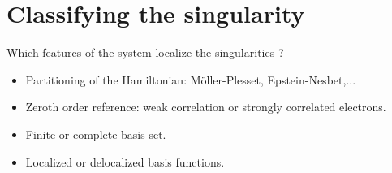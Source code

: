 \documentclass[xcolor=x11names,compress]{beamer}
\renewcommand{\(}{\begin{columns}}
\renewcommand{\)}{\end{columns}}
\newcommand{\<}[1]{\begin{column}{#1}}
\renewcommand{\>}{\end{column}}
\begin{document}
\section{Classifying the singularity}

\begin{frame}{Which features of the system localize the singularities ?}

\begin{itemize}
    \item Partitioning of the Hamiltonian: Möller-Plesset, Epstein-Nesbet,...
    \item Zeroth order reference: weak correlation or strongly correlated electrons.
    \item Finite or complete basis set.
    \item Localized or delocalized basis functions.
\end{itemize}
    
\end{frame}
\end{document}

